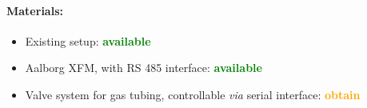 \documentclass[12pt,a4paper]{scrartcl}
\newcommand{\obtain}[0]{\textcolor{orange}{\textbf{obtain}}}
\newcommand{\avail}[0]{\textcolor{green}{\textbf{available}}}
\begin{document}
\paragraph{Materials:}

\begin{itemize}
\item Existing setup: \avail{}
\item Aalborg XFM, with RS 485 interface: \avail{}
\item Valve system for gas tubing, controllable \textit{via} serial
  interface: \obtain{}
\end{itemize}

\begin{figure}[ht]
  \begin{minipage}{.49\textwidth}
  \end{minipage}
  \begin{minipage}{.49\textwidth}
  \end{minipage}


\end{figure}
\end{document}
